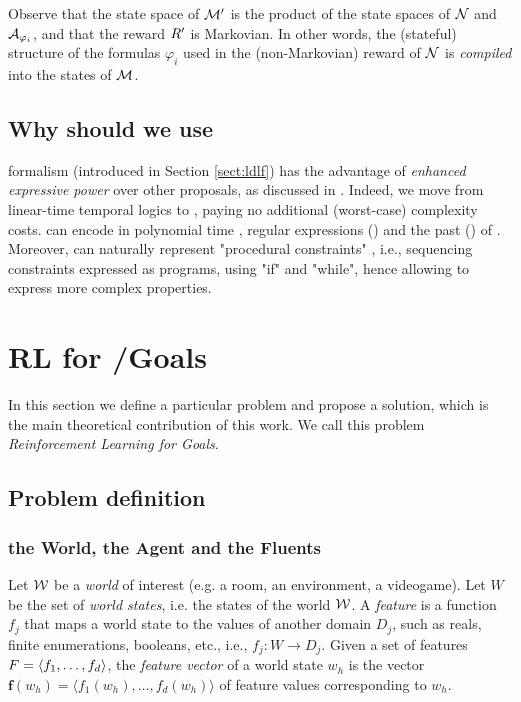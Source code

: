 Observe that the state space of $\mathcal{M}'$ is the product of 
the state spaces of $\mathcal{N}$ and $\mathcal{A}_{\varphi_i}$, and that the reward
$R'$ is Markovian. In other words, the (stateful) structure of
the \LLf formulas $\varphi_i$ used in the 
(non-Markovian) reward of $\mathcal{N}$ is \emph{compiled} into 
the states of $\mathcal{M}$.

\subsection*{Why should we use \LDLf}
\LDLf formalism (introduced in Section \ref{sect:ldlf})  has the advantage of \emph{enhanced expressive power} over other proposals, as discussed in \citep{AAAI1817342}. Indeed, we move from linear-time temporal logics to \LDLf, paying no additional (worst-case) complexity costs. \LDLf can encode in polynomial time \LTLf, regular expressions (\REGEX) and the past \LTL (\PLTL) of \citep{bacchus1996rewarding}.
	Moreover, \LDLf can naturally
	represent "procedural constraints" \citep{Baier:2008:BCP:1620270.1620321}, i.e.,
	sequencing constraints expressed as programs, using "if" and
	"while", hence allowing to express more complex properties.


\section{RL for \LTLf/\LDLf Goals}
\label{sect:rl-for-llf-goals}

In this section we define a particular problem and propose a solution, which is the main theoretical contribution of this work. We call this problem \emph{Reinforcement Learning for \LLf Goals}. 

\subsection{Problem definition}

\subsubsection{the World, the Agent and the Fluents}
Let $\mathcal{W}$ be a \emph{world} of interest (e.g. a room, an environment, a videogame). Let $W$ be the set of \emph{world states}, i.e. the states of the world $\mathcal{W}$. 
A \emph{feature} is a function $f_j$ that maps a world state to the
values of another domain $D_j$, such as reals, finite enumerations,
booleans, etc., i.e., $f_j : W \rightarrow D_j$.
Given a set of features $F = \langle f_1, \dots, f_d \rangle$, the \emph{feature vector} of a world state $w_h$ is the vector
$\mathbf{f}(w_h) = \langle f_1(w_h), \ldots, f_d(w_h) \rangle$ of
feature values corresponding to $w_h$.

